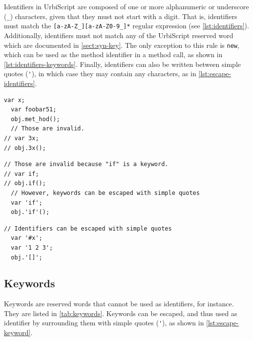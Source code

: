 \documentclass[openright,twoside,12pt]{report}
\newcommand{\us}{UrbiScript\xspace}
\newcommand   {\floatpos}          {htbp}
\newcommand{\lst}[1]{\autoref{lst:#1}}
\newcommand{\sect}[1]{\autoref{sect:#1}}
\newcommand{\tab}[1]{\autoref{tab:#1}}
\begin{document}
Identifiers in \us are composed of one or more alphanumeric or
underscore (\lstinline|_|) characters, given that they must not start
with a digit. That is, identifiers must match the
\lstinline|[a-zA-Z_][a-zA-Z0-9_]*| regular expression (see
\lst{identifiers}).  Additionally, identifiers must not match any of
the \us reserved word which are documented in \sect{syn-key}. The only
exception to this rule is \lstinline|new|, which can be used as the
method identifier in a method call, as shown in
\lst{identifiers-keywords}.  Finally, identifiers can also be written
between simple quotes (\lstinline|'|), in which case they may contain
any characters, as in \lst{escape-identifiers}.

\begin{lstlisting}[caption=Identifiers,label=lst:identifiers,float=\floatpos]
  var x;
  var foobar51;
  obj.met_hod();
  // Those are invalid.
// var 3x;
// obj.3x();
\end{lstlisting}

\begin{lstlisting}[caption=Identifiers cannot be keywords,
  label=lst:identifiers-keywords,float=\floatpos]
  // Those are invalid because "if" is a keyword.
// var if;
// obj.if();
  // However, keywords can be escaped with simple quotes
  var 'if';
  obj.'if'();
\end{lstlisting}

\begin{lstlisting}[caption=Escaping identifiers with simple quotes,
  label=lst:escape-identifiers,float=\floatpos]
  // Identifiers can be escaped with simple quotes
  var '#x';
  var '1 2 3';
  obj.'[]';
\end{lstlisting}

\subsection{Keywords}
\label{sect:syn-key}

Keywords are reserved words that cannot be used as identifiers, for
instance.  They are listed in \tab{keywords}.  Keywords can be
escaped, and thus used as identifier by surrounding them with simple
quotes (\lstinline|'|), as shown in \lst{escape-keyword}.
\end{document}
